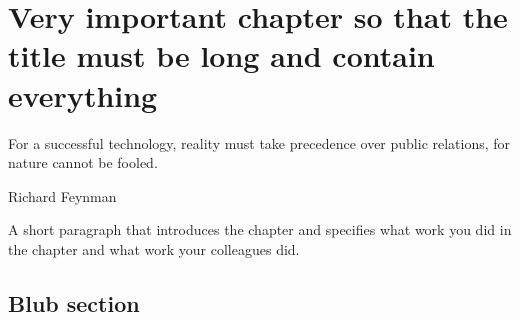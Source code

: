 \chapter[Short chapter title]{Very important chapter so that the title must be long and contain everything}
\label{chap:SLAM}

\epigraph{For a successful technology, reality must take precedence over public relations, for nature cannot be fooled.}{Richard Feynman}

\noindent A short paragraph that introduces the chapter and specifies what work you did in the chapter and what work your colleagues did. 


\section{Blub section}

\kant[20]
